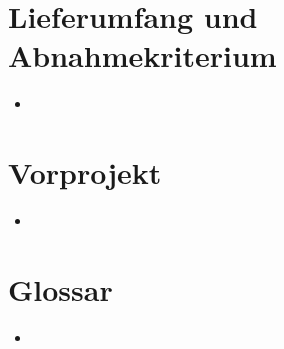 \documentclass[11pt,a4paper]{scrreprt}
\begin{document}
\chapter{Lieferumfang und Abnahmekriterium}
\begin{itemize}
\item
\end{itemize}

\chapter{Vorprojekt}
\begin{itemize}
\item
\end{itemize}

\chapter{Glossar}
\begin{itemize}
\item
\end{itemize}
\end{document}
